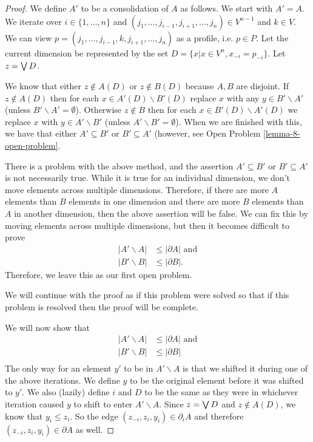 	\begin{proof}
		We define $A'$ to be a consolidation of $A$ as follows. We start with $A' = A$. We iterate over $i \in \{1, \ldots, n\}$ and $(j_1, \ldots, j_{i-1}, j_{i+1}, \ldots, j_n) \in V^{n-1}$ and $k \in V$. We can view $p = (j_1, \ldots, j_{i-1}, k, j_{i+1}, \ldots, j_n)$ as a profile, i.e. $p \in P$. Let the current dimension be represented by the set $D = \{x | x \in V^n, x_{-i} = p_{-i}\}$. Let $z = \operatorname{\bigvee} D$.

		We know that either $z \notin A(D)$ or $z \notin B(D)$ because $A, B$ are disjoint. If $z \notin A(D)$ then for each $x \in A'(D) \backslash B'(D)$ replace $x$ with any $y \in B' \backslash A'$ (unless $B' \backslash A' = \emptyset$). Otherwise $z \notin B$ then for each $x \in B'(D) \backslash A'(D)$ we replace $x$ with $y \in A' \backslash B'$ (unless $A' \backslash B' = \emptyset$). When we are finished with this, we have that either $A' \subseteq B'$ or $B' \subseteq A'$ (however, see Open Problem \ref{lemma-8-open-problem}.

		\begin{openproblem}
			\label{lemma-8-open-problem}
			There is a problem with the above method, and the assertion $A' \subseteq B'$ or $B' \subseteq A'$ is not necessarily true. While it is true for an individual dimension, we don't move elements across multiple dimensions. Therefore, if there are more $A$ elements than $B$ elements in one dimension and there are more $B$ elements than $A$ in another dimension, then the above assertion will be false. We can fix this by moving elements across multiple dimensions, but then it becomes difficult to prove
			\begin{align*}
				|A' \backslash A| &\le |\partial A| \textrm{ and} \\
				|B' \backslash B| &\le |\partial B|.
			\end{align*}
			Therefore, we leave this as our first open problem.

			We will continue with the proof as if this problem were solved so that if this problem is resolved then the proof will be complete.
		\end{openproblem}

		We will now show that
		\begin{align*}
			|A' \backslash A| &\le |\partial A| \textrm{ and} \\
			|B' \backslash B| &\le |\partial B| \\
		\end{align*}
		The only way for an element $y'$ to be in $A' \backslash A$ is that we shifted it during one of the above iterations. We define $y$ to be the original element before it was shifted to $y'$. We also (lazily) define $i$ and $D$ to be the same as they were in whichever iteration caused $y$ to shift to enter $A' \backslash A$. Since $z = \operatorname{\bigvee} D$ and $z \notin A(D)$, we know that $y_i \le z_i$. So the edge $(z_{-i}, z_i, y_i) \in \partial_i A$ and therefore $(z_{-i}, z_i, y_i) \in \partial A$ as well.


\end{proof}
